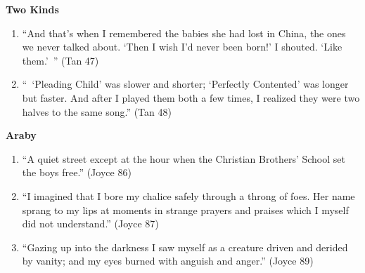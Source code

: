 \documentclass[10pt,letterpaper]{article}
\begin{document}
\textbf{Two Kinds}
\begin{enumerate}
\item ``And that's when I remembered the babies she had lost in China, the ones
we never talked about. `Then I wish I'd never been born!' I shouted. `Like
them.'\ '' (Tan 47)

\item ``\ `Pleading Child' was slower and shorter; `Perfectly Contented' was
longer but faster.  And after I played them both a few times, I realized they
were two halves to the same song.'' (Tan 48)
\end{enumerate}

\textbf{Araby}
\begin{enumerate}
\item ``A quiet street except at the hour when the Christian Brothers' School
set the boys free.'' (Joyce 86)

\item ``I imagined that I bore my chalice safely through a throng of foes.  Her
name sprang to my lips at moments in strange prayers and praises which I myself
did not understand.'' (Joyce 87)

\item ``Gazing up into the darkness I saw myself as a creature driven and
derided by vanity; and my eyes burned with anguish and anger.'' (Joyce 89)
\end{enumerate}
\end{document}
